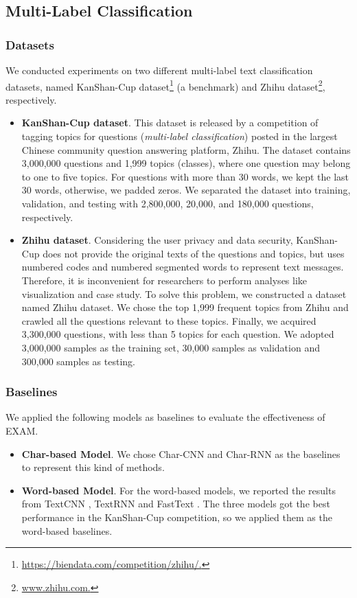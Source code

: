 \documentclass[letterpaper]{article} %
\begin{document}
\subsection{Multi-Label Classification}
\subsubsection{Datasets}
We conducted experiments on two different multi-label text classification datasets, named KanShan-Cup dataset\footnote{\url{https://biendata.com/competition/zhihu/.}} (a benchmark) and Zhihu dataset\footnote{\url{www.zhihu.com.}}, respectively. 
\begin{itemize}
\item \textbf{KanShan-Cup dataset}.
This dataset is released by a competition of tagging topics for questions (\textit{multi-label classification}) posted in the largest Chinese community question answering platform, Zhihu. The dataset contains 3,000,000 questions and 1,999 topics (classes), where one question may belong to one to five topics. For questions with more than 30 words, we kept the last 30 words, otherwise, we padded zeros. We separated the dataset into training, validation, and testing with 2,800,000, 20,000, and 180,000 questions, respectively.

\item \textbf{Zhihu dataset}.
Considering the user privacy and data security, KanShan-Cup does not provide the original texts of the questions and topics, but uses numbered codes and numbered segmented words to represent text messages. Therefore, it is inconvenient for researchers to perform analyses like visualization and case study. To solve this problem, we constructed a dataset named Zhihu dataset. We chose the top 1,999 frequent topics from Zhihu and crawled all the questions relevant to these topics. Finally, we acquired 3,300,000 questions, with less than 5 topics for each question. We adopted 3,000,000 samples as the training set, 30,000 samples as validation and 300,000 samples as testing.
\end{itemize}
\subsubsection{Baselines}
We applied the following models as baselines to evaluate the effectiveness of EXAM.
\begin{itemize}%
\item \textbf{Char-based Model}. We chose Char-CNN \cite{charcnn} and Char-RNN \cite{TextRNN} as the baselines to represent this kind of methods. 
\item \textbf{Word-based Model}. For the word-based models, we reported the results from TextCNN \cite{TextCNN}, TextRNN \cite{TextRNN} and FastText \cite{fasttext}. The three models got the best performance in the KanShan-Cup competition, so we applied them as the word-based baselines.
\end{itemize}
%
\end{document}
